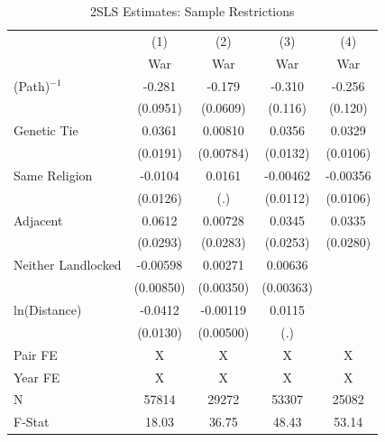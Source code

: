 \documentclass{article}
\begin{document}
\begin{table}[htbp]\centering
\caption{2SLS Estimates: Sample Restrictions \label{tab:RobustIVSubsamples}}
\begin{tabular}{l*{4}{c}}
\toprule
                    &\multicolumn{1}{c}{(1)}&\multicolumn{1}{c}{(2)}&\multicolumn{1}{c}{(3)}&\multicolumn{1}{c}{(4)}\\
                    &\multicolumn{1}{c}{War}&\multicolumn{1}{c}{War}&\multicolumn{1}{c}{War}&\multicolumn{1}{c}{War}\\
\midrule
(Path)$^{-1}$       &      -0.281&      -0.179&      -0.310&      -0.256\\
                    &    (0.0951)&    (0.0609)&     (0.116)&     (0.120)\\
\addlinespace
Genetic Tie         &      0.0361&     0.00810&      0.0356&      0.0329\\
                    &    (0.0191)&   (0.00784)&    (0.0132)&    (0.0106)\\
\addlinespace
Same Religion       &     -0.0104&      0.0161&    -0.00462&    -0.00356\\
                    &    (0.0126)&         (.)&    (0.0112)&    (0.0106)\\
\addlinespace
Adjacent            &      0.0612&     0.00728&      0.0345&      0.0335\\
                    &    (0.0293)&    (0.0283)&    (0.0253)&    (0.0280)\\
\addlinespace
Neither Landlocked  &    -0.00598&     0.00271&     0.00636&            \\
                    &   (0.00850)&   (0.00350)&   (0.00363)&            \\
\addlinespace
ln(Distance)        &     -0.0412&    -0.00119&      0.0115&            \\
                    &    (0.0130)&   (0.00500)&         (.)&            \\
\midrule
Pair FE             &           X&           X&           X&           X\\
Year FE             &           X&           X&           X&           X\\
N                   &       57814&       29272&       53307&       25082\\
F-Stat              &       18.03&       36.75&       48.43&       53.14\\
\bottomrule
\end{tabular}
\end{table}
\end{document}
